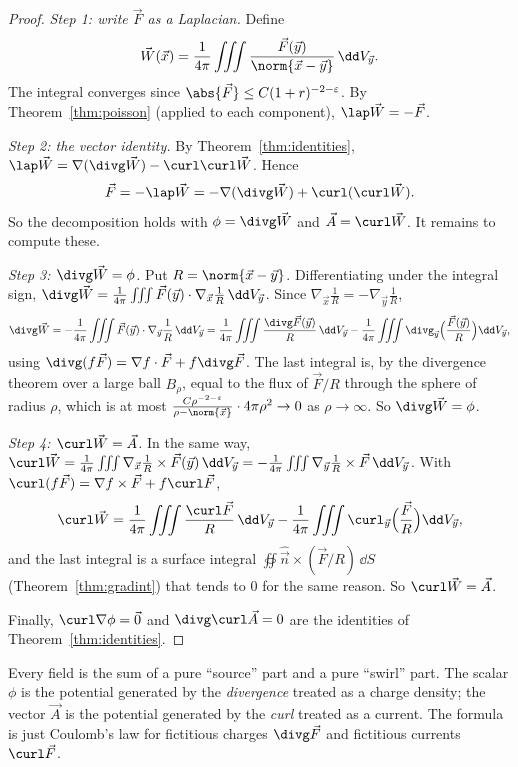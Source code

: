 \begin{proof}
\emph{Step 1: write $\vec F$ as a Laplacian.} Define
\[
\vec W(\vec x)=\frac1{4\pi}\iiint\frac{\vec F(\vec y)}{\norm{\vec x-\vec y}}\,\dd V_{\vec y}.
\]
The integral converges since $\abs{\vec F}\le C(1+r)^{-2-\varepsilon}$. By Theorem~\ref{thm:poisson} (applied to each component), $\lap\vec W=-\vec F$.

\emph{Step 2: the vector identity.} By Theorem~\ref{thm:identities}, $\lap\vec W=\nabla(\divg\vec W)-\curl\curl\vec W$. Hence
\[
\vec F=-\lap\vec W=-\nabla(\divg\vec W)+\curl(\curl\vec W).
\]
So the decomposition holds with $\phi=\divg\vec W$ and $\vec A=\curl\vec W$. It remains to compute these.

\emph{Step 3: $\divg\vec W=\phi$.} Put $R=\norm{\vec x-\vec y}$. Differentiating under the integral sign, $\divg\vec W=\frac1{4\pi}\iiint\vec F(\vec y)\cdot\nabla_{\vec x}\frac1R\,\dd V_{\vec y}$. Since $\nabla_{\vec x}\frac1R=-\nabla_{\vec y}\frac1R$,
\[
\divg\vec W=-\frac1{4\pi}\iiint\vec F(\vec y)\cdot\nabla_{\vec y}\frac1R\,\dd V_{\vec y}=\frac1{4\pi}\iiint\frac{\divg\vec F(\vec y)}R\,\dd V_{\vec y}-\frac1{4\pi}\iiint\divg_{\vec y}\Bigl(\frac{\vec F(\vec y)}R\Bigr)\dd V_{\vec y},
\]
using $\divg(f\vec F)=\nabla f\cdot\vec F+f\divg\vec F$. The last integral is, by the divergence theorem over a large ball $B_\rho$, equal to the flux of $\vec F/R$ through the sphere of radius $\rho$, which is at most $\frac{C\rho^{-2-\varepsilon}}{\rho-\norm{\vec x}}\cdot4\pi\rho^2\to0$ as $\rho\to\infty$. So $\divg\vec W=\phi$.

\emph{Step 4: $\curl\vec W=\vec A$.} In the same way, $\curl\vec W=\frac1{4\pi}\iiint\nabla_{\vec x}\frac1R\times\vec F(\vec y)\,\dd V_{\vec y}=-\frac1{4\pi}\iiint\nabla_{\vec y}\frac1R\times\vec F\,\dd V_{\vec y}$. With $\curl(f\vec F)=\nabla f\times\vec F+f\curl\vec F$,
\[
\curl\vec W=\frac1{4\pi}\iiint\frac{\curl\vec F}R\,\dd V_{\vec y}-\frac1{4\pi}\iiint\curl_{\vec y}\Bigl(\frac{\vec F}R\Bigr)\dd V_{\vec y},
\]
and the last integral is a surface integral $\oiint\hat{\vec n}\times(\vec F/R)\,\dd S$ (Theorem~\ref{thm:gradint}) that tends to $0$ for the same reason. So $\curl\vec W=\vec A$.

Finally, $\curl\nabla\phi=\vec0$ and $\divg\curl\vec A=0$ are the identities of Theorem~\ref{thm:identities}.
\end{proof}

\begin{intuition}
Every field is the sum of a pure ``source'' part and a pure ``swirl'' part. The scalar $\phi$ is the potential generated by the \emph{divergence} treated as a charge density; the vector $\vec A$ is the potential generated by the \emph{curl} treated as a current. The formula is just Coulomb's law for fictitious charges $\divg\vec F$ and fictitious currents $\curl\vec F$.
\end{intuition}

